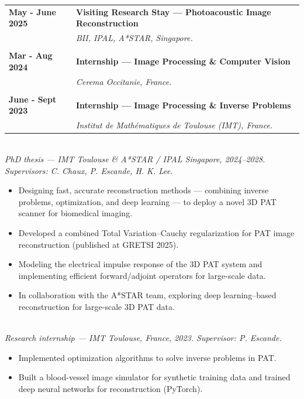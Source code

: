 \documentclass[a4paper,10pt]{article}
\begin{document}
\bigskip
\begin{tabular}{p{3cm}p{13cm}}
    {\bf May - June 2025} & {\bf Visiting Research Stay --- Photoacoustic Image Reconstruction} \\
    & \emph{BII, IPAL, A*STAR, Singapore.} \\
    \vspace{0.1cm}\\
    {\bf Mar - Aug 2024} & {\bf Internship --- Image Processing \& Computer Vision} \\
    & \emph{Cerema Occitanie, France.} \\
    \vspace{0.1cm}\\
    {\bf June - Sept 2023} & {\bf Internship --- Image Processing \& Inverse Problems} \\
    & \emph{Institut de Mathématiques de Toulouse (IMT), France.}
\end{tabular}

\bigskip

 \\
\emph{PhD thesis --- IMT Toulouse \& A*STAR / IPAL Singapore, 2024--2028. Supervisors: C. Chaux, P. Escande, H. K. Lee.}
\begin{itemize}[leftmargin=*, noitemsep, topsep=2pt]
    \item Designing fast, accurate reconstruction methods --- combining inverse problems, optimization, and deep learning --- to deploy a novel 3D PAT scanner for biomedical imaging.
    \item Developed a combined Total Variation--Cauchy regularization for PAT image reconstruction (published at GRETSI 2025).
    \item Modeling the electrical impulse response of the 3D PAT system and implementing efficient forward/adjoint operators for large-scale data.
    \item In collaboration with the A*STAR team, exploring deep learning--based reconstruction for large-scale 3D PAT data.
\end{itemize}

\medskip
{} \\
\emph{Research internship --- IMT Toulouse, France, 2023. Supervisor: P. Escande.}
\begin{itemize}[leftmargin=*, noitemsep, topsep=2pt]
    \item Implemented optimization algorithms to solve inverse problems in PAT.
    \item Built a blood-vessel image simulator for synthetic training data and trained deep neural networks for reconstruction (PyTorch).
\end{itemize}
\end{document}

